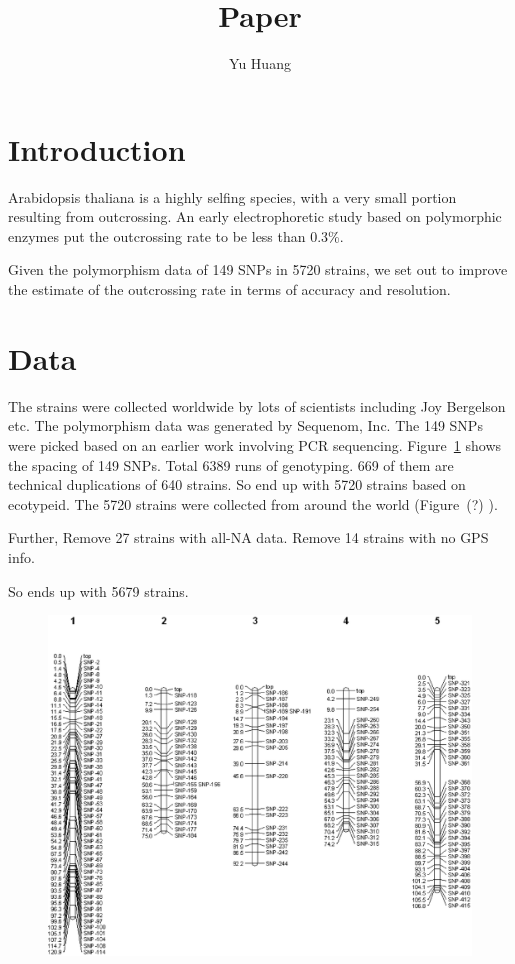 \documentclass[a4paper,10pt]{article}
\title{Paper}
\author{Yu Huang}
\begin{document}
\maketitle

\begin{abstract}

\end{abstract}

\section{Introduction}
Arabidopsis thaliana is a highly selfing species, with a very small portion resulting from outcrossing. An early electrophoretic study based on polymorphic enzymes\cite{Abbott1989} put the outcrossing rate to be less than 0.3\%.

Given the polymorphism data of 149 SNPs in 5720 strains, we set out to improve the estimate of the outcrossing rate in terms of accuracy and resolution.

\section{Data}
The strains were collected worldwide by lots of scientists including Joy Bergelson etc. The polymorphism data was generated by Sequenom, Inc. The 149 SNPs were picked based on an earlier work involving PCR sequencing\cite{Nordborg2005}. Figure~\ref{f1} shows the spacing of 149 SNPs.
Total 6389 runs of genotyping. 669 of them are technical duplications of 640 strains. So end up with 5720 strains based on ecotypeid. The 5720 strains were collected from around the world (Figure~(?) ).

Further, Remove 27 strains with all-NA data. Remove 14 strains with no GPS info.

So ends up with 5679 strains.

\begin{figure}
\includegraphics[width=1\textwidth]{figures/snp_locations_on_chr.eps}
\caption{}\label{f1}
\end{figure}
\end{document}
